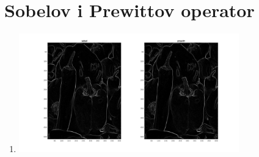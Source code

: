 \documentclass[12pt, a4]{report}
\begin{document}
\section{Sobelov i Prewittov operator}
\begin{enumerate}
    \item
        \begin{minipage}{\linewidth}
            \centering
            \includegraphics[width=0.75\textwidth]{edge}
        \end{minipage}
    
\end{enumerate}
\end{document}
